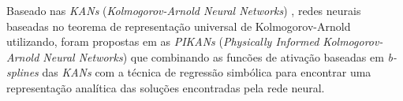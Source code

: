 
Baseado nas \textit{KANs} (\textit{Kolmogorov-Arnold Neural Networks})
\cite{liu-etal:2025-kans}, redes neurais baseadas no teorema de representação 
universal de Kolmogorov-Arnold utilizando, foram propostas em as 
\textit{PIKANs} (\textit{Physically Informed Kolmogorov-Arnold Neural Networks})
que combinando as funcões de ativação baseadas em \textit{b-splines} das
\textit{KANs} com a técnica de regressão simbólica para encontrar uma 
representação analítica das soluções encontradas pela rede neural.
